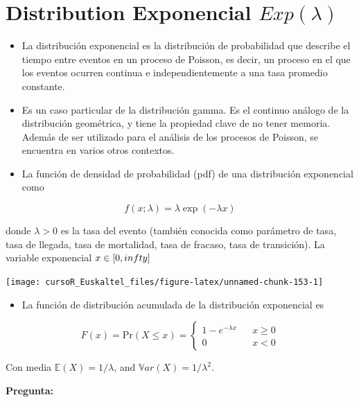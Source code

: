 \documentclass[]{book}
\providecommand{\tightlist}{%
  \setlength{\itemsep}{0pt}\setlength{\parskip}{0pt}}
\begin{document}
\section{\texorpdfstring{Distribution Exponencial
\(Exp(\lambda)\)}{Distribution Exponencial Exp(\textbackslash{}lambda)}}\label{distribution-exponencial-explambda}

\begin{itemize}
\item
  La distribución exponencial es la distribución de probabilidad que
  describe el tiempo entre eventos en un proceso de Poisson, es decir,
  un proceso en el que los eventos ocurren continua e independientemente
  a una tasa promedio constante.
\item
  Es un caso particular de la distribución gamma. Es el continuo análogo
  de la distribución geométrica, y tiene la propiedad clave de no tener
  memoria. Además de ser utilizado para el análisis de los procesos de
  Poisson, se encuentra en varios otros contextos.
\item
  La función de densidad de probabilidad (pdf) de una distribución
  exponencial como
\end{itemize}

\[
f(x;\lambda) =  \lambda \exp(-\lambda x)
\]

donde \(\lambda>0\) es la tasa del evento (también conocida como
parámetro de tasa, tasa de llegada, tasa de mortalidad, tasa de fracaso,
tasa de transición). La variable exponencial \(x \in[0,\\infty]\)

\begin{center}\texttt{[image: cursoR\_Euskaltel\_files/figure-latex/unnamed-chunk-153-1]} \end{center}

\begin{itemize}
\tightlist
\item
  La función de distribución acumulada de la distribución exponencial es
\end{itemize}

\[
F(x) = \mbox{Pr}(X\leq x) = 
  \left\{
    \begin{array}{lcc}
      1- e^{-\lambda x} & & x\geq 0 \\
      0                 & & x < 0
    \end{array}
  \right.
\]

Con media \(\mathbb{E}(X) = 1/\lambda\), and
\(\mathbb{V}ar(X) = 1/\lambda^2\).

\textbf{Pregunta:}
\end{document}
